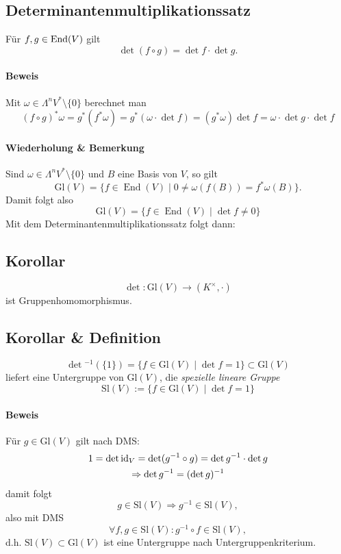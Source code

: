 \subsection{Determinantenmultiplikationssatz}
	\begin{Satz}[Determinantenmultiplikationssatz]
		Für $ f,g\in \operatorname{End}(V) $ gilt
			\[ \det(f\circ g) = \det f \cdot \det g. \]
	\end{Satz}
\paragraph{Beweis}
	Mit $ \omega\in\Lambda^nV^*\setminus\{0\} $ berechnet man
		\[ (f\circ g)^*\omega = g^*(f^*\omega) = g^*(\omega\cdot \det f) = (g^*\omega)\det f = \omega \cdot \det g\cdot \det f \]

\paragraph{Wiederholung \& Bemerkung}
	Sind $ \omega\in \Lambda^nV^*\setminus \{0\} $ und $ B $ eine Basis von $ V $, so gilt
		\[ \mathrm{Gl}(V) = \{f\in \operatorname{End}(V)\mid 0\neq \omega(f(B))=f^*\omega(B)\}. \]
	Damit folgt also
		\[ \mathrm{Gl}(V) = \{f\in\operatorname{End}(V)\mid \det f \neq 0\} \]
	Mit dem Determinantenmultiplikationssatz folgt dann:	
\subsection{Korollar}
\begin{Korollar}
	\[ \det : \mathrm{Gl}(V)\to (K^\times,\cdot) \]
	ist Gruppenhomomorphismus.
\end{Korollar}
\subsection{Korollar \& Definition}
\begin{Definition}
	\[ \det\text{}^{-1}(\{1\}) = \{f\in \mathrm{Gl}(V)\mid \det f = 1\} \subset \mathrm{Gl}(V) \]
	liefert eine Untergruppe von $ \mathrm{Gl}(V) $, die \emph{spezielle lineare Gruppe}
	\[ \mathrm{Sl}(V):= \{f\in \mathrm{Gl}(V)\mid \det f = 1 \} \]
\end{Definition}
\paragraph{Beweis}
	Für $ g\in \mathrm{Gl}(V) $ gilt nach DMS:
        \begin{gather*}
            1 = \det \operatorname{id}_V = \det(g^{-1}\circ g) = \det g^{-1}\cdot \det g \\
		\Rightarrow \det g^{-1} = (\det g)^{-1}
        \end{gather*}
	damit folgt
		\[ g\in \mathrm{Sl}(V)\Rightarrow g^{-1} \in \mathrm{Sl}(V), \]
	also mit DMS
		\[ \forall f,g\in \mathrm{Sl}(V):g^{-1}\circ f\in \mathrm{Sl}(V), \]
	d.h. $ \mathrm{Sl}(V)\subset \mathrm{Gl}(V) $ ist eine Untergruppe nach Untergruppenkriterium.
